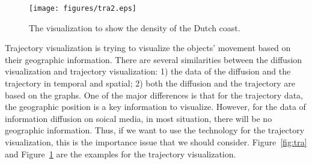\begin{itemize}
\begin{figure}[!htb]
  \centering
  \texttt{[image: figures/tra2.eps]}
  \caption{The visualization to show the density of the Dutch coast.\cite{willems2009visualization}}
  \label{fig:tra2}
\end{figure}

Trajectory visualization is trying to visualize the objects' movement based on their geographic information. There are several similarities between the diffusion visualization and trajectory visualization: 1) the data of the diffusion and the trajectory in temporal and spatial; 2) both the diffusion and the trajectory are based on the graphs. One of the major differences is that for the trajectory data, the geographic position is a key information to visualize. However, for the data of information diffusion on soical media, in most situation, there will be no geographic information. Thus, if we want to use the technology for the trajectory visualization, this is the importance issue that we should consider. Figure~\ref{fig:tra} and Figure~\ref{fig:tra2} are the examples for the trajectory visualization.

\end{itemize}
